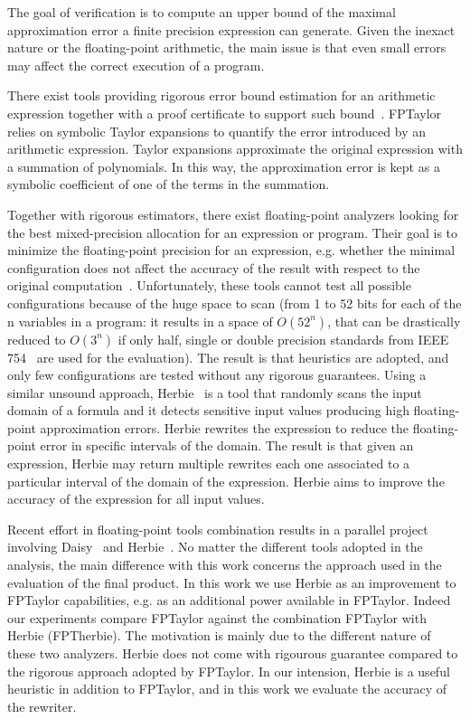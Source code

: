 \documentclass[runningheads]{llncs}
\begin{document}
The goal of verification is to compute an upper bound of the maximal approximation error a finite precision expression can generate. Given the inexact nature or the floating-point arithmetic, the main issue is that even small errors may affect the correct execution of a program.


There exist tools providing rigorous error bound estimation for an arithmetic expression together with a proof certificate to support such bound~\cite{fptaylor,magron,precisa,daisy}. FPTaylor~\cite{fptaylor} relies on symbolic Taylor expansions to quantify the error introduced by an arithmetic expression. Taylor expansions approximate the original expression with a summation of polynomials. In this way, the approximation error is kept as a symbolic coefficient of one of the terms in the summation.

Together with rigorous estimators, there exist floating-point analyzers looking for the best mixed-precision allocation for an expression or program. Their goal is to minimize the floating-point precision for an expression, e.g. whether the minimal configuration does not affect the accuracy of the result with respect to the original computation~\cite{mixedLam,herbgrind,precimonius}.
Unfortunately, these tools cannot test all possible configurations because of the huge space to scan (from 1 to 52 bits for each of the n variables in a program: it results in a space of $O(52^n)$, that can be drastically reduced to $O(3^n)$ if only half, single or double precision standards from IEEE 754~\cite{ieee} are used for the evaluation). 
The result is that heuristics are adopted, and only few configurations are tested without any rigorous guarantees.
Using a similar unsound approach, Herbie~\cite{herbie} is a tool that randomly scans the input domain of a formula and it detects sensitive input values producing high floating-point approximation errors. Herbie rewrites the expression to reduce the floating-point error in specific intervals of the domain. The result is that given an expression, Herbie may return multiple rewrites each one associated to a particular interval of the domain of the expression. Herbie aims to improve the accuracy of the expression for all input values.

Recent effort in floating-point tools combination results in a parallel project~\cite{daisyherbie} involving Daisy~\cite{daisy} and Herbie~\cite{herbie}. No matter the different tools adopted in the analysis, the main difference with this work concerns the approach used in the evaluation of the final product. In this work we use Herbie as an improvement to FPTaylor capabilities, e.g. as an additional power available in FPTaylor. Indeed our experiments compare FPTaylor against the combination FPTaylor with Herbie (FPTherbie). The motivation is mainly due to the different nature of these two analyzers. Herbie does not come with rigourous guarantee compared to the rigorous approach adopted by FPTaylor. In our intension, Herbie is a useful heuristic in addition to FPTaylor, and in this work we evaluate the accuracy of the rewriter.
\end{document}
